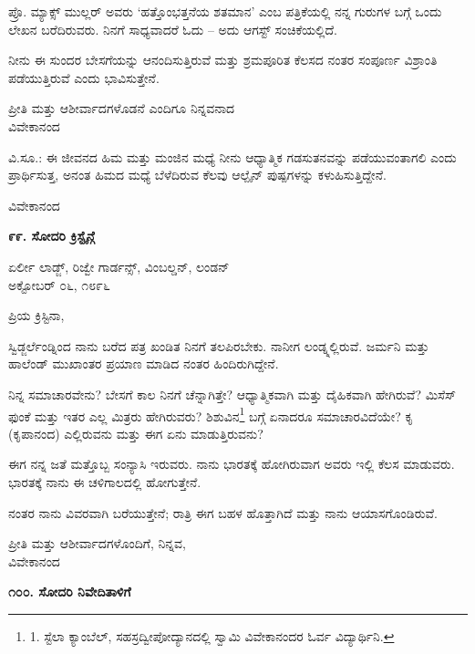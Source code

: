ಪ್ರೊ. ಮ್ಯಾಕ್ಸ್ ಮುಲ್ಲರ್ ಅವರು ‘ಹತ್ತೊಂಭತ್ತನೆಯ ಶತಮಾನ’ ಎಂಬ ಪತ್ರಿಕೆಯಲ್ಲಿ ನನ್ನ ಗುರುಗಳ ಬಗ್ಗೆ ಒಂದು ಲೇಖನ ಬರೆದಿರುವರು. ನಿನಗೆ ಸಾಧ್ಯವಾದರೆ ಓದು – ಅದು ಆಗಸ್ಟ್ ಸಂಚಿಕೆಯಲ್ಲಿದೆ.

ನೀನು ಈ ಸುಂದರ ಬೇಸಗೆಯನ್ನು ಆನಂದಿಸುತ್ತಿರುವೆ ಮತ್ತು ಶ್ರಮಪೂರಿತ ಕೆಲಸದ ನಂತರ ಸಂಪೂರ್ಣ ವಿಶ್ರಾಂತಿ ಪಡೆಯುತ್ತಿರುವೆ ಎಂದು ಭಾವಿಸುತ್ತೇನೆ.

\begin{flushright}
ಪ್ರೀತಿ ಮತ್ತು ಆಶೀರ್ವಾದಗಳೊಡನೆ ಎಂದಿಗೂ ನಿನ್ನವನಾದ\\ವಿವೇಕಾನಂದ
\end{flushright}

ವಿ.ಸೂ.: ಈ ಜೀವನದ ಹಿಮ ಮತ್ತು ಮಂಜಿನ ಮಧ್ಯೆ ನೀನು ಆಧ್ಯಾತ್ಮಿಕ ಗಡಸುತನವನ್ನು ಪಡೆಯುವಂತಾಗಲಿ ಎಂದು ಪ್ರಾರ್ಥಿಸುತ್ತ, ಅನಂತ ಹಿಮದ ಮಧ್ಯೆ ಬೆಳೆದಿರುವ ಕೆಲವು ಆಲ್ಪೈನ್ ಪುಷ್ಪಗಳನ್ನು ಕಳುಹಿಸುತ್ತಿದ್ದೇನೆ.

\begin{flushright}
ವಿವೇಕಾನಂದ
\end{flushright}

\begin{center}
\textbf{೯೯. ಸೋದರಿ ಕ್ರಿಸ್ಟೈನ್ಗೆ}
\end{center}

\begin{flushright}
ಏರ್ಲೀ ಲಾಡ್ಜ್, ರಿಜ್ವೇ ಗಾರ್ಡನ್ಸ್, ವಿಂಬಲ್ಡನ್, ಲಂಡನ್\\ಅಕ್ಟೋಬರ್ ೦೬, ೧೮೯೬
\end{flushright}

ಪ್ರಿಯ ಕ್ರಿಸ್ಟಿನಾ,

ಸ್ವಿಡ್ಜರ್ಲೆಂಡ್ನಿಂದ ನಾನು ಬರೆದ ಪತ್ರ ಖಂಡಿತ ನಿನಗೆ ತಲಪಿರಬೇಕು. ನಾನೀಗ ಲಂಡ್ನ್ನಲ್ಲಿರುವೆ. ಜರ್ಮನಿ ಮತ್ತು ಹಾಲೆಂಡ್ ಮುಖಾಂತರ ಪ್ರಯಾಣ ಮಾಡಿದ ನಂತರ ಹಿಂದಿರುಗಿದ್ದೇನೆ.

ನಿನ್ನ ಸಮಾಚಾರವೇನು? ಬೇಸಗೆ ಕಾಲ ನಿನಗೆ ಚೆನ್ನಾಗಿತ್ತೇ? ಆಧ್ಯಾತ್ಮಿಕವಾಗಿ ಮತ್ತು ದೈಹಿಕವಾಗಿ ಹೇಗಿರುವೆ? ಮಿಸೆಸ್ ಫುಂಕೆ ಮತ್ತು ಇತರ ಎಲ್ಲ ಮಿತ್ರರು ಹೇಗಿರುವರು? ಶಿಶುವಿನ\footnote{1. ಸ್ಟೆಲಾ ಕ್ಯಾಂಬೆಲ್, ಸಹಸ್ರದ್ವೀಪೋದ್ಯಾನದಲ್ಲಿ ಸ್ವಾಮಿ ವಿವೇಕಾನಂದರ ಓರ್ವ ವಿದ್ಯಾರ್ಥಿನಿ.} ಬಗ್ಗೆ ಏನಾದರೂ ಸಮಾಚಾರವಿದೆಯೇ? ಕೃ (ಕೃಪಾನಂದ) ಎಲ್ಲಿರುವನು ಮತ್ತು ಈಗ ಏನು ಮಾಡುತ್ತಿರುವನು?

ಈಗ ನನ್ನ ಜತೆ ಮತ್ತೊಬ್ಬ ಸಂನ್ಯಾಸಿ ಇರುವರು. ನಾನು ಭಾರತಕ್ಕೆ ಹೋಗಿರುವಾಗ ಅವರು ಇಲ್ಲಿ ಕೆಲಸ ಮಾಡುವರು. ಭಾರತಕ್ಕೆ ನಾನು ಈ ಚಳಿಗಾಲದಲ್ಲಿ ಹೋಗುತ್ತೇನೆ.

ನಂತರ ನಾನು ವಿವರವಾಗಿ ಬರೆಯುತ್ತೇನೆ; ರಾತ್ರಿ ಈಗ ಬಹಳ ಹೊತ್ತಾಗಿದೆ ಮತ್ತು ನಾನು ಆಯಾಸಗೊಂಡಿರುವೆ.

\begin{flushright}
ಪ್ರೀತಿ ಮತ್ತು ಆಶೀರ್ವಾದಗಳೊಂದಿಗೆ, ನಿನ್ನವ,\\ವಿವೇಕಾನಂದ
\end{flushright}

\begin{center}
\textbf{೧೦೦. ಸೋದರಿ ನಿವೇದಿತಾಳಿಗೆ}
\end{center}


